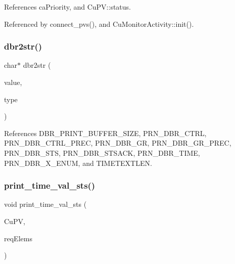 References ca\+Priority, and Cu\+P\+V\+::status.



Referenced by connect\+\_\+pvs(), and Cu\+Monitor\+Activity\+::init().

\mbox{\label{cuepics-world_8h_a703b41b0f7b2221eff13d827ae0ab9b3}} 
\subsubsection{dbr2str()}
{\footnotesize\ttfamily char$\ast$ dbr2str (\begin{DoxyParamCaption}\item[{const void $\ast$}]{value,  }\item[{unsigned}]{type }\end{DoxyParamCaption})}



References D\+B\+R\+\_\+\+P\+R\+I\+N\+T\+\_\+\+B\+U\+F\+F\+E\+R\+\_\+\+S\+I\+ZE, P\+R\+N\+\_\+\+D\+B\+R\+\_\+\+C\+T\+RL, P\+R\+N\+\_\+\+D\+B\+R\+\_\+\+C\+T\+R\+L\+\_\+\+P\+R\+EC, P\+R\+N\+\_\+\+D\+B\+R\+\_\+\+GR, P\+R\+N\+\_\+\+D\+B\+R\+\_\+\+G\+R\+\_\+\+P\+R\+EC, P\+R\+N\+\_\+\+D\+B\+R\+\_\+\+S\+TS, P\+R\+N\+\_\+\+D\+B\+R\+\_\+\+S\+T\+S\+A\+CK, P\+R\+N\+\_\+\+D\+B\+R\+\_\+\+T\+I\+ME, P\+R\+N\+\_\+\+D\+B\+R\+\_\+\+X\+\_\+\+E\+N\+UM, and T\+I\+M\+E\+T\+E\+X\+T\+L\+EN.

\mbox{\label{cuepics-world_8h_a64ebf50cc59eed67f3b6c169d1474adb}} 
\subsubsection{print\+\_\+time\+\_\+val\+\_\+sts()}
{\footnotesize\ttfamily void print\+\_\+time\+\_\+val\+\_\+sts (\begin{DoxyParamCaption}\item[{\textbf{ Cu\+PV} $\ast$}]{Cu\+PV,  }\item[{unsigned long}]{req\+Elems }\end{DoxyParamCaption})}

\mbox{\label{cuepics-world_8h_a9261e3a03fea98e28b8071f356f316db}} 

